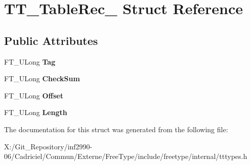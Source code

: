 \hypertarget{struct_t_t___table_rec__}{\section{T\-T\-\_\-\-Table\-Rec\-\_\- Struct Reference}
\label{struct_t_t___table_rec__}
}
\subsection*{Public Attributes}
\begin{DoxyCompactItemize}
\item 
\hypertarget{struct_t_t___table_rec___aaccaf9e9d3421fc37fa6e51875534995}{F\-T\-\_\-\-U\-Long {\bfseries Tag}}\label{struct_t_t___table_rec___aaccaf9e9d3421fc37fa6e51875534995}

\item 
\hypertarget{struct_t_t___table_rec___aacf9207fae3522bb65359c2288900fca}{F\-T\-\_\-\-U\-Long {\bfseries Check\-Sum}}\label{struct_t_t___table_rec___aacf9207fae3522bb65359c2288900fca}

\item 
\hypertarget{struct_t_t___table_rec___a91840e1cee040f8da6a34a081dda17b6}{F\-T\-\_\-\-U\-Long {\bfseries Offset}}\label{struct_t_t___table_rec___a91840e1cee040f8da6a34a081dda17b6}

\item 
\hypertarget{struct_t_t___table_rec___aa0d3a1f4491bf4418bc26241bdd7d21b}{F\-T\-\_\-\-U\-Long {\bfseries Length}}\label{struct_t_t___table_rec___aa0d3a1f4491bf4418bc26241bdd7d21b}

\end{DoxyCompactItemize}


The documentation for this struct was generated from the following file\-:\begin{DoxyCompactItemize}
\item 
X\-:/\-Git\-\_\-\-Repository/inf2990-\/06/\-Cadriciel/\-Commun/\-Externe/\-Free\-Type/include/freetype/internal/tttypes.\-h\end{DoxyCompactItemize}
